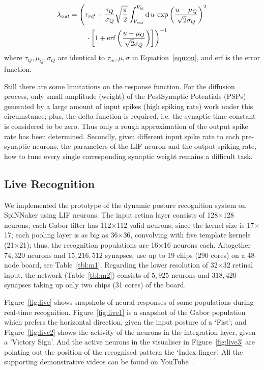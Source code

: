 \documentclass[journal]{journal}
\def\D{\mathrm{d}}
\begin{document}
\begin{align}
\lambda_\mathit{out} &=\left(\tau_\mathit{ref} + \frac{\tau_Q}{\sigma_Q}\sqrt{\frac{\pi}{2}} \int_{V_\mathit{rest}}^{V_\mathit{th}}\D\,u \:\exp \left(\frac{u-\mu_Q}{\sqrt2\sigma_Q} \right )^{2} \right. \nonumber \\
&\qquad \left. \vphantom{\int_t} \cdot  \left[1+\mathrm{erf} \left(\frac{u-\mu_Q}{\sqrt2\sigma_Q} \right ) \right ]\right)^{-1}
\label{equ:sgt}
\end{align}
where $\tau_Q, \mu_Q, \sigma_Q$ are identical to $\tau_m, \mu, \sigma$ in Equation~\ref{equ:ou}, and erf is the error function.

Still there are some limitations on the response function. 
For the diffusion process, only small amplitude (weight) of the PostSynaptic Potentials (PSPs) generated by a large amount of input spikes (high spiking rate) work under this circumstance; 
plus, the delta function is required, i.e. the synaptic time constant is considered to be zero. Thus only a rough approximation of the output spike rate has been determined.
Secondly, given different input spike rate to each pre-synaptic neurons, the parameters of the LIF neuron and the output spiking rate, how to tune every single corresponding synaptic weight remains a difficult task.


\subsection{Live Recognition}
We implemented the prototype of the dynamic posture recognition system on SpiNNaker using LIF neurons. 
The input retina layer consists of 128$\times$128 neurons; 
each Gabor filter has 112$\times$112 valid neurons, since the kernel size is 17$\times$17; 
each pooling layer is as big as 36$\times$36, convolving with five template kernels (21$\times$21); 
thus, the recognition populations are 16$\times$16 neurons each. Altogether $74,320$ neurons and $15,216,512$ synapses, use up to 19 chips (290 cores) on a 48-node board, see Table~\ref{tbl:m1}. Regarding the lower resolution of 32$\times$32 retinal input, the network (Table~\ref{tbl:m2}) consists of $5,925$ neurons and $318,420$ synapses taking up only two chips (31 cores) of the board.

Figure~\ref{fig:live} shows snapshots of neural responses of some populations during real-time recognition.
Figure~\ref{fig:live1} is a snapshot of the Gabor population which prefers the horizontal direction, given the input posture of a `Fist'; and Figure~\ref{fig:live2} shows the activity of the neurons in the integration layer, given a 'Victory Sign'.
And the active neurons in the visualiser in Figure~\ref{fig:live3} are pointing out the position of the recognised pattern the `Index finger'. 
All the supporting demonstrative videos can be found on YouTube~\cite{video1, video2, video3}. %
\end{document}
